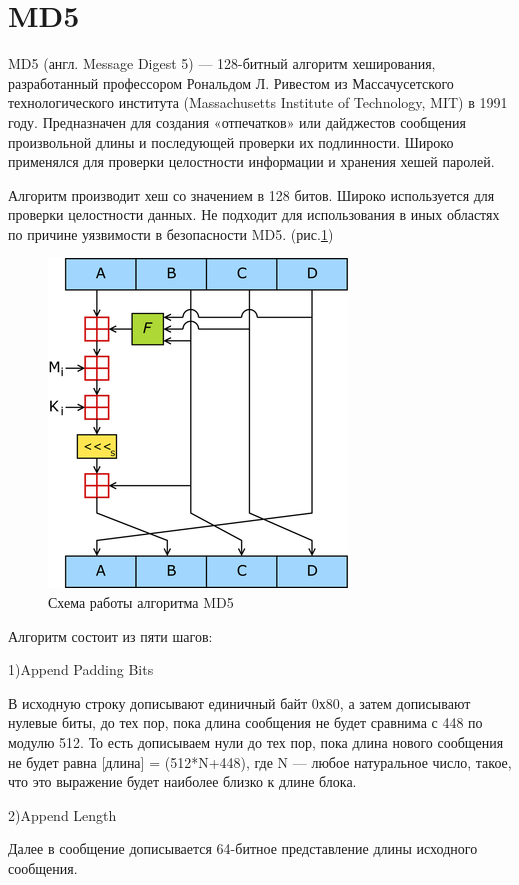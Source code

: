 \documentclass[a4paper, 12pt, oneside]{scrartcl}
\begin{document}
    \section{MD5}\label{sec:section2}
    MD5 (англ. Message Digest 5) — 128-битный алгоритм хеширования, разработанный профессором Рональдом Л. Ривестом из Массачусетского технологического института (Massachusetts Institute of Technology, MIT) в 1991 году.
    Предназначен для создания «отпечатков» или дайджестов сообщения произвольной длины и последующей проверки их подлинности.
    Широко применялся для проверки целостности информации и хранения хешей паролей.

    Алгоритм производит хеш со значением в 128 битов. Широко используется для проверки целостности данных.
    Не подходит для использования в иных областях по причине уязвимости в безопасности MD5. (рис.\ref{fig:key})
    \begin{figure}[h!]
		\centering
		\includegraphics[scale=0.9]{MD5}
		\caption{Схема работы алгоритма MD5}
		\label{fig:key}
	\end{figure}
    \par
    Алгоритм состоит из пяти шагов:\par
    1)Append Padding Bits\par
    В исходную строку дописывают единичный байт 0х80, а затем дописывают нулевые биты, до тех пор, пока длина сообщения не будет сравнима с 448 по модулю 512.
    То есть дописываем нули до тех пор, пока длина нового сообщения не будет равна [длина] = (512*N+448), где N — любое натуральное число, такое, что это выражение будет наиболее близко к длине блока.

    2)Append Length\par
    Далее в сообщение дописывается 64-битное представление длины исходного сообщения.
\end{document}
